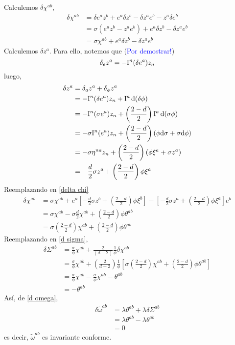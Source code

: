 Calculemos $\delta\chi^{ab}$,
\begin{align}
  \delta\chi^{ab}&=\delta e^{a}z^b+e^{a}\delta z^b-\delta z^{a}e^b-z^{a}\delta e^b\\
  &=\sigma (e^{a}z^b-z^{a}e^b)+e^{a}\delta z^b-\delta z^{a}e^b\\
  &=\sigma\chi^{ab}+e^{a}\delta z^b-\delta z^{a}e^b \label{delta chi}
\end{align}
Calculemos $\delta z^{a}$. Para ello, notemos que (\textcolor{blue}{Por demostrar!})
\begin{equation}
  \delta_e z^{a}=-\mathrm{I} ^n(\delta e^{a})z_n
\end{equation}
luego,
\begin{align}
  \delta z^{a}&=\delta_a z^{a}+\delta_\phi z^{a}\\
  &=-\mathrm{I} ^n(\delta e^{a})z_n+\mathrm{I}^{a}\dd (\delta \phi)\\
  &=-\mathrm{I}^n (\sigma e^{a})z_n+\left(\frac{2-d}{2}\right)\mathrm{I}^{a}\dd (\sigma \phi)\\
  &=-\sigma \mathrm{I}^n (e^{a})z_n+\left(\frac{2-d}{2}\right)(\phi\dd\sigma+\sigma\dd\phi)\\
  &=-\sigma \eta^{na}z_n+\left(\frac{2-d}{2}\right)(\phi \xi^{a}+\sigma z^{a})\\
  &=-\frac{d}{2}\sigma z^{a}+\left(\frac{2-d}{2}\right)\phi \xi^{a}
\end{align}
Reemplazando en \eqref{delta chi}
\begin{align}
  \delta\chi^{ab}&=\sigma\chi^{ab}+e^{a}\left[-\frac{d}{2}\sigma z^{b}+\left(\frac{2-d}{2}\right)\phi \xi^{b}\right]-\left[-\frac{d}{2}\sigma z^{a}+\left(\frac{2-d}{2}\right)\phi \xi^{a}\right]e^b\\
  &=\sigma \chi^{ab}-\sigma\frac{d}{2}\chi^{ab}+\left(\frac{2-d}{2}\right)\phi\theta^{ab}\\
  &=\sigma\left(\frac{2-d}{2}\right)\chi^{ab}+\left(\frac{2-d}{2}\right)\phi\theta^{ab}
\end{align}
Reemplazando en \eqref{d sigma},
\begin{equation}
\begin{split}
  \delta\Sigma^{ab}&=\frac{\sigma}{\phi}\chi^{ab}+\frac{2}{(d-2)}\frac{1}{\phi}\delta\chi^{ab}\label{d sigma}\\
  &=\frac{\sigma}{\phi}\chi^{ab}+\left(\frac{2}{d-2}\right)\frac{1}{\phi}\left[\sigma\left(\frac{2-d}{2}\right)  \chi^{ab}+\left(\frac{2-d}{2}\right)\phi\theta^{ab}\right]\\
  &=\frac{\sigma}{\phi}\chi^{ab}-\frac{\sigma}{\phi}\chi^{ab}-\theta^{ab}\\
  &=-\theta^{ab}
\end{split}
\end{equation}
Así, de \eqref{d omega},
\begin{align}
  \delta\tilde{\omega}^{ab}&=\lambda\theta^{ab}+\lambda\delta\Sigma^{ab}\label{d omega}\\
  &=\lambda\theta^{ab}-\lambda\theta^{ab}\\
  &=0
\end{align}
es decir, $\tilde{\omega}^{ab}$ es invariante conforme.

